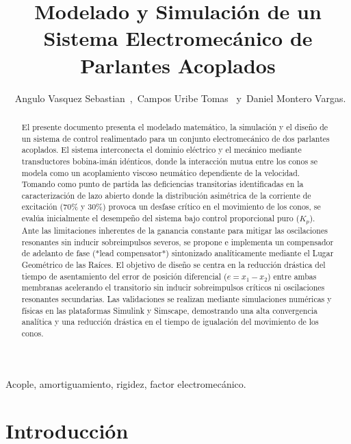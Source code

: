 \documentclass[journal]{IEEEtran}
\title{Modelado y Simulación de un Sistema Electromecánico de Parlantes Acoplados}
\author{~Angulo Vasquez Sebastian~,~Campos Uribe Tomas~
        y~Daniel Montero Vargas.}
\begin{document}
\maketitle
\begin{abstract}
El presente documento presenta el modelado matemático, la simulación y el diseño de un sistema de control realimentado para un conjunto electromecánico de dos parlantes acoplados. El sistema interconecta el dominio eléctrico y el mecánico mediante transductores bobina-imán idénticos, donde la interacción mutua entre los conos se modela como un acoplamiento viscoso neumático dependiente de la velocidad. Tomando como punto de partida las deficiencias transitorias identificadas en la caracterización de lazo abierto donde la distribución asimétrica de la corriente de excitación (70\% y 30\%) provoca un desfase crítico en el movimiento de los conos, se evalúa inicialmente el desempeño del sistema bajo control proporcional puro ($K_p$). Ante las limitaciones inherentes de la ganancia constante para mitigar las oscilaciones resonantes sin inducir sobreimpulsos severos, se propone e implementa un compensador de adelanto de fase (*lead compensator*) sintonizado analíticamente mediante el Lugar Geométrico de las Raíces. El objetivo de diseño se centra en la reducción drástica del tiempo de asentamiento del error de posición diferencial ($e = x_1 - x_2$) entre ambas membranas acelerando el transitorio sin inducir sobreimpulsos críticos ni oscilaciones resonantes secundarias. Las validaciones se realizan mediante simulaciones numéricas y físicas en las plataformas Simulink y Simscape, demostrando una alta convergencia analítica y una reducción drástica en el tiempo de igualación del movimiento de los conos.





\end{abstract}

\begin{IEEEkeywords}
Acople, amortiguamiento, rigidez, factor electromecánico.
\end{IEEEkeywords}


\section{Introducción}
\end{document}
